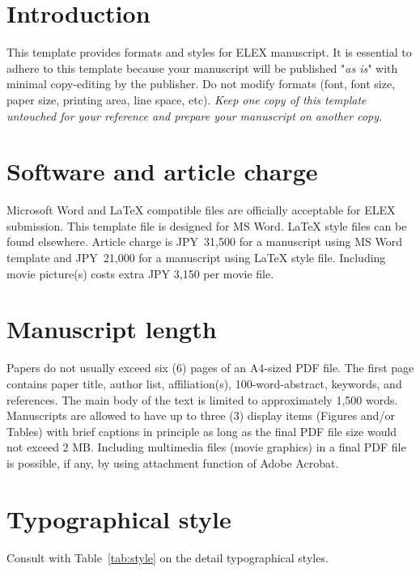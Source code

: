 \documentclass{elex}
\begin{document}
\section{Introduction}

This template provides formats and styles for ELEX manuscript. It is essential to adhere to this template because your manuscript will be published "{\it as is}" with minimal copy-editing by the publisher.  Do not modify formats (font, font size, paper size, printing area, line space, etc).  {\it Keep one copy of this template untouched for your reference and prepare your manuscript on another copy.}


\section{Software and article charge}


Microsoft Word and LaTeX compatible files are officially acceptable for ELEX submission. This template file is designed for MS Word.  LaTeX style files can be found elsewhere\cite{web link}.  Article charge is JPY~31,500 for a manuscript using MS Word template and JPY~21,000 for a manuscript using LaTeX style file. Including movie picture(s) costs extra JPY 3,150 per movie file.


\section{Manuscript length} 

Papers do not usually exceed six (6) pages of an A4-sized PDF file.  The first page contains paper title, author list, affiliation(s), 100-word-abstract, keywords, and references.  The main body of the text is limited to approximately 1,500 words.  Manuscripts are allowed to have up to three (3) display items (Figures and/or Tables) with brief captions in principle as long as the final PDF file size would not exceed 2 MB.  Including multimedia files (movie graphics) in a final PDF file is possible, if any, by using attachment function of Adobe Acrobat.


\section{Typographical style}


Consult with Table~\ref{tab:style} on the detail typographical styles. 
\end{document}
